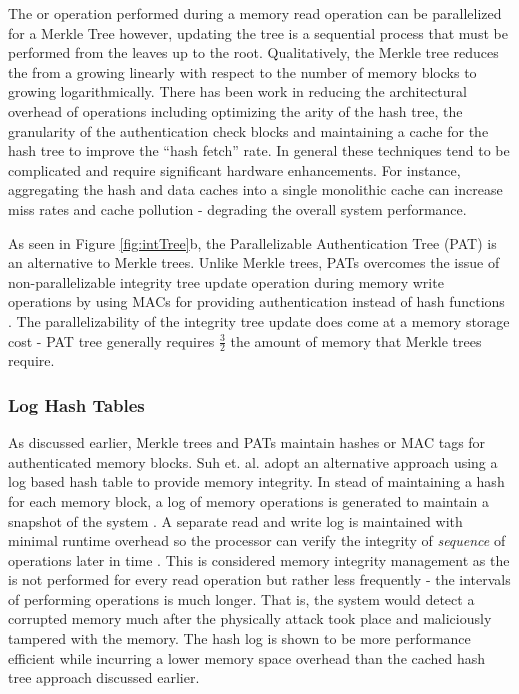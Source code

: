 The  or  operation performed during a
memory read operation can be parallelized for a Merkle Tree however, updating
the tree is a sequential process that must be performed from the leaves up to
the root. Qualitatively, the Merkle tree reduces the  from
a growing linearly with respect to the number of memory blocks to growing
logarithmically. There has been work in reducing the architectural overhead of
 operations including optimizing the arity of the hash
tree, the granularity of the authentication check blocks and maintaining a
cache for the hash tree to improve the ``hash fetch'' rate. In general these
techniques tend to be complicated and require significant hardware
enhancements. For instance, aggregating the hash and data caches into a single
monolithic cache can increase miss rates and cache pollution - degrading the
overall system performance.

As seen in Figure \ref{fig:intTree}b, the Parallelizable Authentication Tree
(PAT) \cite{patTree} is an alternative to Merkle trees. Unlike Merkle trees,
PATs overcomes the issue of non-parallelizable integrity tree update operation
during memory write operations by using MACs for providing authentication
instead of hash functions \cite{surveyInt}. The parallelizability of the
integrity tree update does come at a memory storage cost - PAT tree generally
requires $\frac{3}{2}$ the amount of memory that Merkle trees require.

\subsubsection{Log Hash Tables}
As discussed earlier, Merkle trees and PATs maintain hashes or MAC tags for
authenticated memory blocks. Suh et. al. adopt an alternative approach using a
log based hash table to provide memory integrity. In stead of maintaining a
hash for each memory block, a log of memory operations is generated to maintain
a snapshot of the system \cite{suh-memIntEnc}. A separate read and write log is
maintained with minimal runtime overhead so the processor can verify the
integrity of \textit{sequence} of operations later in time
\cite{suh-memIntEnc}. This is considered  memory integrity management
as the  is not performed for every read operation but
rather less frequently - the intervals of performing 
operations is much longer. That is, the system would detect a
corrupted memory much after the physically attack took place and maliciously
tampered with the memory. The hash log is shown to be more performance
efficient while incurring a lower memory space overhead than the cached hash
tree approach discussed earlier.


